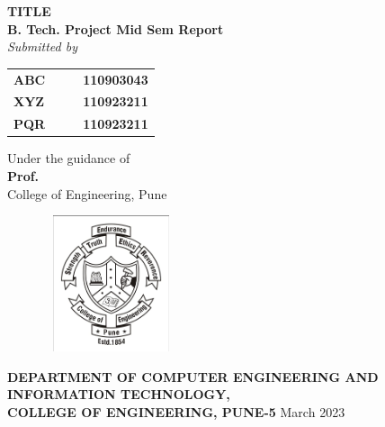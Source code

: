 \begin{titlepage}
\begin{center}
\LARGE{\bf{TITLE\\}}	%
\Large{\bf{ B. Tech. Project Mid Sem Report\\}}		%
\Large{\em{Submitted by\\}}
\begin{table}[htbp]
	\begin{center}
	\begin{tabular}{ l c c l }
	\Large\bf{ABC} & & & \Large\bf{110903043} \\[0.3cm] 
	\Large\bf{XYZ} & & & \Large\bf{110923211} \\[0.3cm]
	\Large\bf{PQR} & & & \Large\bf{110923211} \\
	\end{tabular}
	\end{center}
	\end{table}

\Large{Under the guidance of\\ }
\Large{\bf{Prof. }\\}
\Large{College of Engineering, Pune\\}
\begin{figure}[h]
\centering
\includegraphics[width=4cm,height=4cm]{COEP_logo.jpeg}
\end{figure}


\Large{\bf{DEPARTMENT OF COMPUTER ENGINEERING AND \\INFORMATION TECHNOLOGY,\\ 
COLLEGE OF ENGINEERING, PUNE-5}}
\vfill
\large{March 2023}
\end{center}
\end{titlepage}
